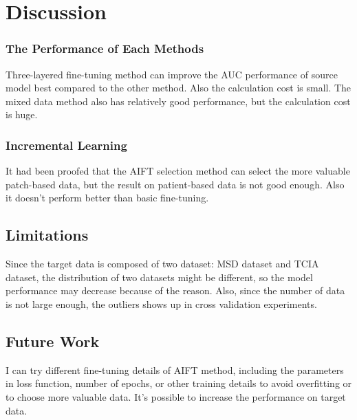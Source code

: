 \chapter{Discussion}
\subsection{The Performance of Each Methods} 
Three-layered fine-tuning method can improve the AUC performance of source model best compared to the other method. Also the calculation cost is small. 
The mixed data method also has relatively good performance, but the calculation cost is huge. 
\subsection{Incremental Learning} 
It had been proofed that the AIFT selection method can select the more valuable patch-based data, but the result on patient-based data is not good enough. Also it doesn't perform better than basic fine-tuning.  

\section{Limitations} 

Since the target data is composed of two dataset: MSD dataset and TCIA dataset, the distribution of two datasets might be different, so the model performance may decrease because of the reason. Also, since the number of data is not large enough, the outliers shows up in cross validation experiments. 

\section{Future Work}
I can try different fine-tuning details of AIFT method, including the  parameters in loss function, number of epochs, or other training details to avoid overfitting or to choose more valuable data. It's possible to increase the performance on target data. 

